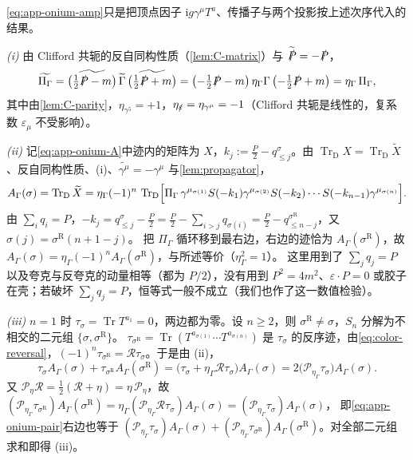 \documentclass[UTF8,a4paper,11pt,fontset=fandol]{ctexart}
\makeatletter
\theoremstyle{cplain}
\theoremstyle{cdefinition}
\theoremstyle{cremark}
\renewcommand{\proofname}{证明}
\renewenvironment{proof}[1][\proofname]{\par\pushQED{\qed}\normalfont\topsep6\p@\@plus6\p@\relax
  \trivlist\item[\hskip\labelsep\itshape #1\hspace{0.5em}]\ignorespaces}{\popQED\endtrivlist\@endpefalse}
\numberwithin{equation}{section}
\DeclareMathOperator{\Tr}{Tr}
\newcommand{\TrD}{\operatorname{Tr}_{\mathrm{D}}}   %
\newcommand{\sla}[1]{\slashed{#1}}                  %
\newcommand{\Rop}{\mathcal{R}}                       %
\newcommand{\ii}{\mathrm{i}}                        %
\newcommand{\Cconj}[1]{\widetilde{#1}}              %
\makeatother
\begin{document}
\begin{proof}
\cref{eq:app-onium-amp}只是把顶点因子 $\ii g\gamma^\mu T^a$、传播子与两个投影按上述次序代入的结果。

\emph{(i)} 由 Clifford 共轭的反自同构性质（\cref{lem:C-matrix}）与 $\Cconj{\sla P}=-\sla P$，
\begin{equation*}
\Cconj{\Pi_\Gamma}=\Cconj{\bigl(\tfrac12\sla P-m\bigr)}\,\Cconj\Gamma\,\Cconj{\bigl(\tfrac12\sla P+m\bigr)}=\bigl(-\tfrac12\sla P-m\bigr)\,\eta_\Gamma\Gamma\,\bigl(-\tfrac12\sla P+m\bigr)=\eta_\Gamma\,\Pi_\Gamma ,
\end{equation*}
其中由\cref{lem:C-parity}，$\eta_{\gamma^5}=+1$，$\eta_{\sla\varepsilon}=\eta_{\gamma^\mu}=-1$（Clifford 共轭是线性的，复系数 $\varepsilon_\mu$ 不受影响）。

\emph{(ii)} 记\cref{eq:app-onium-A}中迹内的矩阵为 $X$，$k_j:=\frac P2-q^\sigma_{\le j}$。由 $\TrD X=\TrD\Cconj X$、反自同构性质、(i)、$\Cconj{\gamma^\mu}=-\gamma^\mu$ 与\cref{lem:propagator}，
\begin{equation*}
A_\Gamma(\sigma)=\TrD\Cconj X=\eta_\Gamma(-1)^n\,\TrD\Bigl[\Pi_\Gamma\,\gamma^{\mu_{\sigma(1)}}S(-k_1)\gamma^{\mu_{\sigma(2)}}S(-k_2)\cdots S(-k_{n-1})\gamma^{\mu_{\sigma(n)}}\Bigr].
\end{equation*}
由 $\sum_iq_i=P$，$-k_j=q^\sigma_{\le j}-\frac P2=\frac P2-\sum_{i>j}q_{\sigma(i)}=\frac P2-q^{\sigma^{\mathrm R}}_{\le n-j}$，又 $\sigma(j)=\sigma^{\mathrm R}(n+1-j)$。
把 $\Pi_\Gamma$ 循环移到最右边，右边的迹恰为 $A_\Gamma(\sigma^{\mathrm R})$，故 $A_\Gamma(\sigma)=\eta_\Gamma(-1)^nA_\Gamma(\sigma^{\mathrm R})$，与所述等价（$\eta_\Gamma^2=1$）。
这里用到了 $\sum_jq_j=P$ 以及夸克与反夸克的动量相等（都为 $P/2$），没有用到 $P^2=4m^2$、$\varepsilon\cdot P=0$ 或胶子在壳；若破坏 $\sum_jq_j=P$，恒等式一般不成立（我们也作了这一数值检验）。

\emph{(iii)} $n=1$ 时 $\tau_\sigma=\Tr T^{a_1}=0$，两边都为零。设 $n\ge2$，则 $\sigma^{\mathrm R}\neq\sigma$，$S_n$ 分解为不相交的二元组 $\{\sigma,\sigma^{\mathrm R}\}$。
$\tau_{\sigma^{\mathrm R}}=\Tr(T^{a_{\sigma(1)}}\cdots T^{a_{\sigma(n)}})$ 是 $\tau_\sigma$ 的反序迹，由\cref{eq:color-reversal}，$(-1)^n\tau_{\sigma^{\mathrm R}}=\Rop\tau_\sigma$。于是由 (ii)，
\begin{equation}\label{eq:app-onium-pair}
\tau_\sigma A_\Gamma(\sigma)+\tau_{\sigma^{\mathrm R}}A_\Gamma(\sigma^{\mathrm R})=\bigl(\tau_\sigma+\eta_\Gamma\Rop\tau_\sigma\bigr)A_\Gamma(\sigma)=2\bigl(\mathcal P_{\eta_\Gamma}\tau_\sigma\bigr)A_\Gamma(\sigma).
\end{equation}
又 $\mathcal P_\eta\Rop=\frac12(\Rop+\eta)=\eta\,\mathcal P_\eta$，故 $(\mathcal P_{\eta_\Gamma}\tau_{\sigma^{\mathrm R}})A_\Gamma(\sigma^{\mathrm R})=\eta_\Gamma(\mathcal P_{\eta_\Gamma}\Rop\tau_\sigma)A_\Gamma(\sigma)=(\mathcal P_{\eta_\Gamma}\tau_\sigma)A_\Gamma(\sigma)$，
即\cref{eq:app-onium-pair}右边也等于 $(\mathcal P_{\eta_\Gamma}\tau_\sigma)A_\Gamma(\sigma)+(\mathcal P_{\eta_\Gamma}\tau_{\sigma^{\mathrm R}})A_\Gamma(\sigma^{\mathrm R})$。对全部二元组求和即得 (iii)。


\end{proof}
\end{document}
